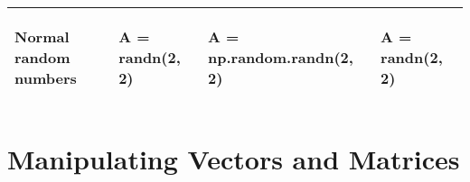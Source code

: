 \documentclass[10pt, landscape]{article}
\newenvironment{Shaded}{}{}
\newcommand{\DecValTok}[1]{\textcolor[rgb]{0.25,0.63,0.44}{{#1}}}
\newcommand{\FloatTok}[1]{\textcolor[rgb]{0.25,0.63,0.44}{{#1}}}
\newcommand{\OperatorTok}[1]{\textcolor[rgb]{0.40,0.40,0.40}{{#1}}}
\newcommand{\NormalTok}[1]{{#1}}
\begin{document}
\begin{multicols}{2}
\begin{tabular}[ ]{@{}llll@{}}
\begin{minipage}[t]{0.24\columnwidth}
Normal random numbers\strut
\end{minipage} & \begin{minipage}[t]{0.20\columnwidth}\raggedright\strut
\begin{Shaded}
\begin{Highlighting}[]
\NormalTok{A = randn(}\FloatTok{2}\NormalTok{, }\FloatTok{2}\NormalTok{)}
\end{Highlighting}
\end{Shaded}
\strut
\end{minipage} & \begin{minipage}[t]{0.25\columnwidth}\raggedright\strut
\begin{Shaded}
\begin{Highlighting}[]
\NormalTok{A }\OperatorTok{=} \NormalTok{np.random.randn(}\DecValTok{2}\NormalTok{, }\DecValTok{2}\NormalTok{)}
\end{Highlighting}
\end{Shaded}
\strut
\end{minipage} & \begin{minipage}[t]{0.20\columnwidth}\raggedright\strut
\begin{Shaded}
\begin{Highlighting}[]
\NormalTok{A = randn(}\FloatTok{2}\NormalTok{, }\FloatTok{2}\NormalTok{)}
\end{Highlighting}
\end{Shaded}
\strut
\end{minipage}\tabularnewline
\bottomrule
\end{tabular}

\section{Manipulating Vectors and
Matrices}\label{manipulating-vectors-and-matrices}


\end{multicols}
\end{document}
